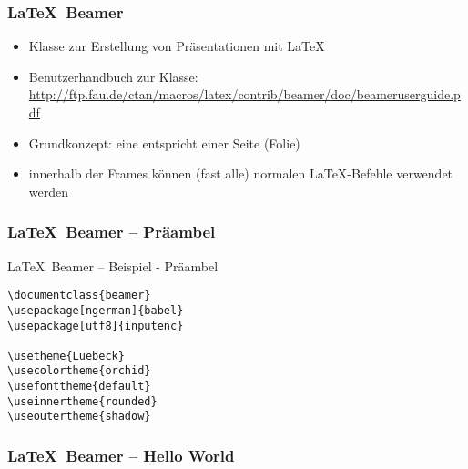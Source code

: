 \begin{frame}[fragile]
	\frametitle{\LaTeX\ Beamer}
	\begin{itemize}
		\item Klasse zur Erstellung von Präsentationen mit \LaTeX
		\item Benutzerhandbuch zur Klasse:
		\href{http://ftp.fau.de/ctan/macros/latex/contrib/beamer/doc/beameruserguide.pdf}{http://ftp.fau.de/ctan/macros/latex/contrib/beamer/doc/beameruserguide.pdf} \\[0.5cm]
		\item Grundkonzept: eine  entspricht einer Seite (Folie)
		\item innerhalb der Frames können (fast alle) normalen \LaTeX-Befehle verwendet werden
	\end{itemize}
\end{frame}

\begin{frame}[fragile]
	\frametitle{\LaTeX\ Beamer -- Präambel}
	\begin{block}{\LaTeX\ Beamer -- Beispiel - Präambel}
		\begin{lstlisting}
\documentclass{beamer}
\usepackage[ngerman]{babel}
\usepackage[utf8]{inputenc}

\usetheme{Luebeck}
\usecolortheme{orchid}
\usefonttheme{default}
\useinnertheme{rounded}
\useoutertheme{shadow}
		\end{lstlisting}
	\end{block}
\end{frame}


\begin{frame}
	\frametitle{\LaTeX\ Beamer -- Hello World}
\end{frame}

